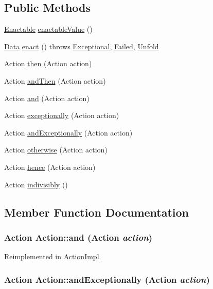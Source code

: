 \subsection*{Public Methods}
\begin{CompactItemize}
\item 
\hyperlink{interfaceEnactable}{Enactable} \hyperlink{interfaceAction_a0}{enactable\-Value} ()
\item 
\hyperlink{interfaceData}{Data} \hyperlink{interfaceAction_a1}{enact} () throws \hyperlink{classExceptional}{Exceptional}, \hyperlink{classFailed}{Failed}, \hyperlink{classUnfold}{Unfold}
\item 
Action \hyperlink{interfaceAction_a2}{then} (Action action)
\item 
Action \hyperlink{interfaceAction_a3}{and\-Then} (Action action)
\item 
Action \hyperlink{interfaceAction_a4}{and} (Action action)
\item 
Action \hyperlink{interfaceAction_a5}{exceptionally} (Action action)
\item 
Action \hyperlink{interfaceAction_a6}{and\-Exceptionally} (Action action)
\item 
Action \hyperlink{interfaceAction_a7}{otherwise} (Action action)
\item 
Action \hyperlink{interfaceAction_a8}{hence} (Action action)
\item 
Action \hyperlink{interfaceAction_a9}{indivisibly} ()
\end{CompactItemize}


\subsection{Member Function Documentation}
\hypertarget{interfaceAction_a4}{
\subsubsection[and]{\setlength{\rightskip}{0pt plus 5cm}Action Action::and (Action {\em action})}}
\label{interfaceAction_a4}




Reimplemented in \hyperlink{classActionImpl_a14}{Action\-Impl}.\hypertarget{interfaceAction_a6}{
\subsubsection[andExceptionally]{\setlength{\rightskip}{0pt plus 5cm}Action Action::and\-Exceptionally (Action {\em action})}}
\label{interfaceAction_a6}




